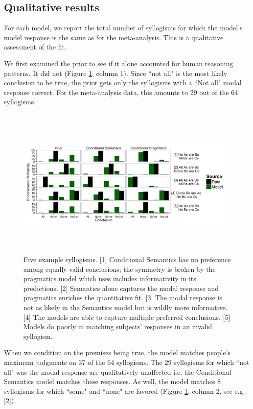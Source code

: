 \documentclass[10pt,letterpaper]{article}
\begin{document}
\subsection{Qualitative results}
For each model, we report the total number of syllogisms for which the model's model response is the same as for the meta-analysis. This is a qualitative assessment of the fit. 

We first examined the prior to see if it alone accounted for human reasoning patterns. It did not (Figure \ref{fig:barplots}, column 1). Since ``not all" is the most likely conclusion to be true, the prior gets only the syllogisms with a ``Not all" modal response correct. For the meta-analysis data, this amounts to 29 out of the 64 syllogisms.

\begin{figure}
\centering
    \includegraphics[width=\textwidth,height=7.5cm]{fig1_multibar_luceSpeak2}
    \caption{Five example syllogisms. 
    [1] Conditional Semantics has no preference among equally valid conclusions; the symmetry is broken by the pragmatics model which uses includes informativity in its predictions.     
    [2] Semantics alone captures the modal response and pragmatics enriches the quantitative fit.     
    [3] The modal response is not as likely in the Semantics model but is wildly more informative. [4] The models are able to capture multiple preferred conclusions. [5] Models do poorly in matching subjects' responses in an invalid syllogism.}
  \label{fig:barplots}
\end{figure}


When we condition on the premises being true, the model matches people's maximum judgments on 37 of the 64 syllogisms. The 29 syllogisms for which ``not all" was the modal response are qualitatively unaffected i.e. the Conditional Semantics model matches these responses. As well, the model matches 8 syllogisms for which ``some" and ``none" are favored (Figure \ref{fig:barplots}, column 2, see e.g. [2]). 
\end{document}
